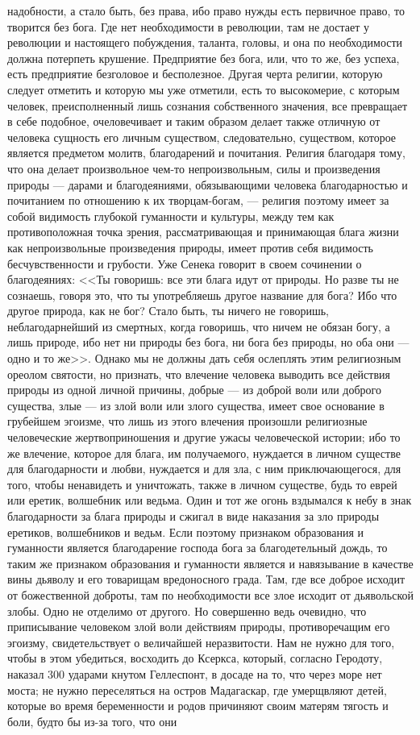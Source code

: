 \documentclass[12pt]{article}
\begin{document}
надобности, а стало быть, без права, ибо право нужды есть первичное право, то творится без бога. Где нет необходимости в революции, там не достает у революции и настоящего побуждения, таланта, головы, и она по необходимости должна потерпеть крушение. Предприятие без бога, или, что то же, без успеха, есть предприятие безголовое и бесполезное. Другая черта религии, которую следует отметить и которую мы уже отметили, есть то высокомерие, с которым человек, преисполненный лишь сознания собственного значения, все превращает в себе подобное, очеловечивает и таким образом делает также отличную от человека сущность его личным существом, следовательно, существом, которое является предметом молитв, благодарений и почитания. Религия благодаря тому, что она делает произвольное чем-то непроизвольным, силы и произведения природы --- дарами и благодеяниями, обязывающими человека благодарностью и почитанием по отношению к их творцам-богам, --- религия поэтому имеет за собой видимость глубокой гуманности и культуры, между тем как противоположная точка зрения, рассматривающая и принимающая блага жизни как непроизвольные произведения природы, имеет против себя видимость бесчувственности и грубости. Уже Сенека говорит в своем сочинении о благодеяниях: <<Ты говоришь: все эти блага идут от природы. Но разве ты не сознаешь, говоря это, что ты употребляешь другое название для бога? Ибо что другое природа, как не бог? Стало быть, ты ничего не говоришь, неблагодарнейший из смертных, когда говоришь, что ничем не обязан богу, а лишь природе, ибо нет ни природы без бога, ни бога без природы, но оба они --- одно и то же>>. Однако мы не должны дать себя ослеплять этим религиозным ореолом святости, но признать, что влечение человека выводить все действия природы из одной личной причины, добрые --- из доброй воли или доброго существа, злые --- из злой воли или злого существа, имеет свое основание в грубейшем эгоизме, что лишь из этого влечения произошли религиозные человеческие жертвоприношения и другие ужасы человеческой истории; ибо то же влечение, которое для блага, им получаемого, нуждается в личном существе для благодарности и любви, нуждается и для зла, с ним приключающегося, для того, чтобы ненавидеть и уничтожать, также в личном существе, будь то еврей или еретик, волшебник или ведьма. Один и тот же огонь вздымался к небу в знак благодарности за блага природы и сжигал в виде наказания за зло природы еретиков, волшебников и ведьм. Если поэтому признаком образования и гуманности является благодарение господа бога за благодетельный дождь, то таким же признаком образования и гуманности является и навязывание в качестве вины дьяволу и его товарищам вредоносного града. Там, где все доброе исходит от божественной доброты, там по необходимости все злое исходит от дьявольской злобы. Одно не отделимо от другого. Но совершенно ведь очевидно, что приписывание человеком злой воли действиям природы, противоречащим его эгоизму, свидетельствует о величайшей неразвитости. Нам не нужно для того, чтобы в этом убедиться, восходить до Ксеркса, который, согласно Геродоту, наказал 300 ударами кнутом Геллеспонт, в досаде на то, что через море нет моста; не нужно переселяться на остров Мадагаскар, где умерщвляют детей, которые во время беременности и родов причиняют своим матерям тягость и боли, будто бы из-за того, что они 
\end{document}
